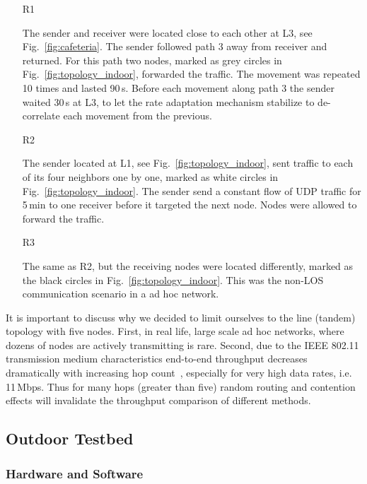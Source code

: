 \documentclass[11pt,draftclsnofoot,journal,onecolumn]{IEEEtran}
\begin{document}
\begin{itemize}

\item[R1]

The sender and receiver were located close to each other at L3, see Fig.~\ref{fig:cafeteria}. The sender followed path 3 away from receiver and returned. For this path two nodes, marked as grey circles in Fig.~\ref{fig:topology_indoor}, forwarded the traffic. The movement was repeated 10 times and lasted 90\,s. Before each movement along path 3 the sender waited 30\,s at L3, to let the rate adaptation mechanism stabilize to de-correlate each movement from the previous.

\item[R2]

The sender located at L1, see Fig.~\ref{fig:topology_indoor}, sent traffic to each of its four neighbors one by one, marked as white circles in Fig.~\ref{fig:topology_indoor}.  The sender send a constant flow of UDP traffic for 5\,min to one receiver before it targeted the next node. Nodes were allowed to forward the traffic. 

\item[R3]

The same as R2, but the receiving nodes were located differently, marked as the black circles in Fig.~\ref{fig:topology_indoor}. This was the non-LOS communication scenario in a ad hoc network. 
\end{itemize}

It is important to discuss why we decided to limit ourselves to the line (tandem) topology with five nodes. First, in real life, large scale ad hoc networks, where dozens of nodes are actively transmitting is rare. Second, due to the IEEE 802.11 transmission medium characteristics end-to-end throughput decreases dramatically with increasing hop count~\cite{Li_Ciit_2004}, especially for very high data rates, i.e. \,11\,Mbps. Thus for many hops (greater than five) random routing and contention effects will invalidate the throughput comparison of different methods.

\subsection{Outdoor Testbed}
\label{sec:outdoor_testbed}

\subsubsection{Hardware and Software}
\label{sec:hardware_outdoor}
\end{document}

